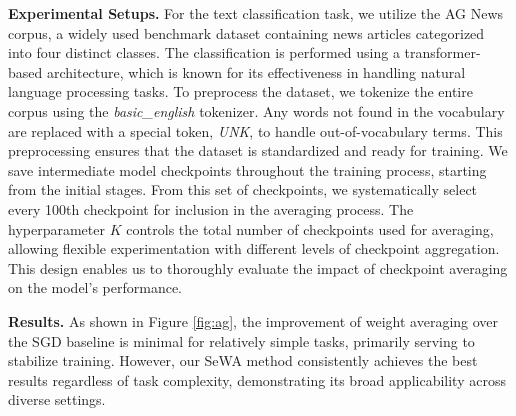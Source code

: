 \textbf{Experimental Setups.}
For the text classification task, we utilize the AG News corpus, a widely used benchmark dataset containing news articles categorized into four distinct classes. The classification is performed using a transformer-based architecture, which is known for its effectiveness in handling natural language processing tasks.
%
To preprocess the dataset, we tokenize the entire corpus using the \textit{basic\_english} tokenizer. Any words not found in the vocabulary are replaced with a special token, \textit{UNK}, to handle out-of-vocabulary terms. This preprocessing ensures that the dataset is standardized and ready for training.
%
We save intermediate model checkpoints throughout the training process, starting from the initial stages. From this set of checkpoints, we systematically select every 100th checkpoint for inclusion in the averaging process. The hyperparameter $K$ controls the total number of checkpoints used for averaging, allowing flexible experimentation with different levels of checkpoint aggregation. This design enables us to thoroughly evaluate the impact of checkpoint averaging on the model’s performance.


\textbf{Results.}
As shown in Figure \ref{fig:ag}, the improvement of weight averaging over the SGD baseline is minimal for relatively simple tasks, primarily serving to stabilize training. However, our SeWA method consistently achieves the best results regardless of task complexity, demonstrating its broad applicability across diverse settings.